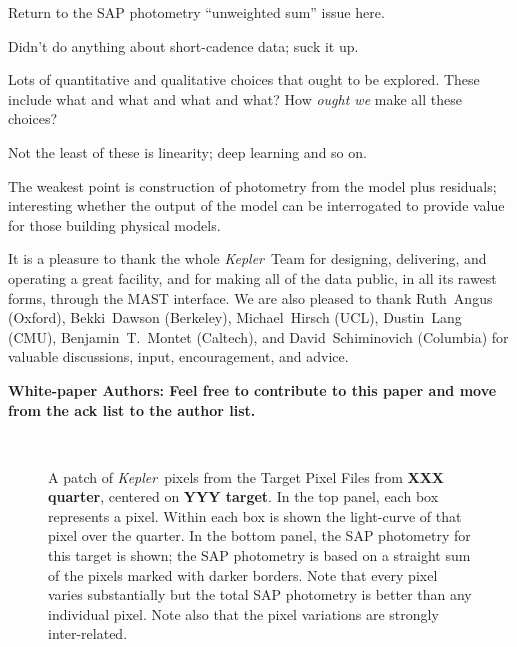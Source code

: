 \documentclass[12pt, preprint]{aastex}
\newcommand{\project}[1]{\textsl{#1}}
\newcommand{\Kepler}{\project{Kepler}}
\newcommand{\todo}[1]{\textbf{#1}}
\begin{document}
Return to the SAP photometry ``unweighted sum'' issue here.

Didn't do anything about short-cadence data; suck it up.

Lots of quantitative and qualitative choices that ought to be explored.
These include what and what and what and what?
How \emph{ought we} make all these choices?

Not the least of these is linearity; deep learning and so on.

The weakest point is construction of photometry from the model plus residuals;
  interesting whether the output of the model can be interrogated
  to provide value for those building physical models.

\acknowledgements
It is a pleasure to thank the whole \Kepler\ Team
  for designing, delivering, and operating a great facility,
  and for making all of the data public, in all its rawest forms, through the MAST interface.
We are also pleased to thank
  Ruth~Angus (Oxford),
  Bekki~Dawson (Berkeley),
  Michael~Hirsch (UCL),
  Dustin~Lang (CMU),
  Benjamin~T.~Montet (Caltech),
  and
  David~Schiminovich (Columbia)
for valuable discussions, input, encouragement, and advice.

\todo{White-paper Authors:  Feel free to contribute to this paper and move from the ack list to the author list.}

\clearpage
\begin{figure}
~ %
\caption{A patch of \Kepler\ pixels from the Target Pixel Files
  from \todo{XXX quarter}, centered on \todo{YYY target}.
  In the top panel, each box represents a pixel.
  Within each box is shown the light-curve of that pixel over the quarter.
  In the bottom panel, the SAP photometry for this target is shown;
  the SAP photometry is based on a straight sum of the pixels marked with darker borders.
  Note that every pixel varies substantially but the total SAP photometry is better than any individual pixel.
  Note also that the pixel variations are strongly inter-related.\label{fig:pixelpatch}}
\end{figure}
\end{document}
